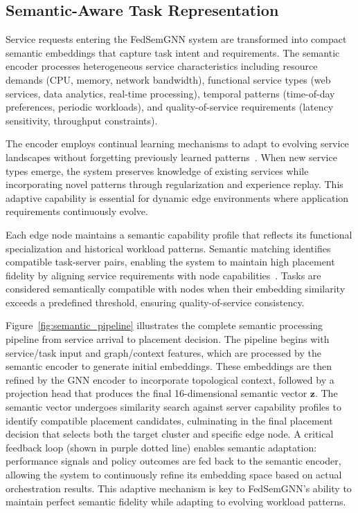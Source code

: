 \documentclass[conference]{IEEEtran}
\begin{document}
	\subsection{Semantic-Aware Task Representation}
	\label{subsec:semantic_representation}
	
	Service requests entering the FedSemGNN system are transformed into compact semantic embeddings that capture task intent and requirements. The semantic encoder processes heterogeneous service characteristics including resource demands (CPU, memory, network bandwidth), functional service types (web services, data analytics, real-time processing), temporal patterns (time-of-day preferences, periodic workloads), and quality-of-service requirements (latency sensitivity, throughput constraints).
	
	The encoder employs continual learning mechanisms to adapt to evolving service landscapes without forgetting previously learned patterns~\cite{yan2023v2v, prathiba2022}. When new service types emerge, the system preserves knowledge of existing services while incorporating novel patterns through regularization and experience replay. This adaptive capability is essential for dynamic edge environments where application requirements continuously evolve.
	
	Each edge node maintains a semantic capability profile that reflects its functional specialization and historical workload patterns. Semantic matching identifies compatible task-server pairs, enabling the system to maintain high placement fidelity by aligning service requirements with node capabilities~\cite{li2021network, jere2023distributed}. Tasks are considered semantically compatible with nodes when their embedding similarity exceeds a predefined threshold, ensuring quality-of-service consistency.
	
	Figure~\ref{fig:semantic_pipeline} illustrates the complete semantic processing pipeline from service arrival to placement decision. The pipeline begins with service/task input and graph/context features, which are processed by the semantic encoder to generate initial embeddings. These embeddings are then refined by the GNN encoder to incorporate topological context, followed by a projection head that produces the final 16-dimensional semantic vector $\mathbf{z}$. The semantic vector undergoes similarity search against server capability profiles to identify compatible placement candidates, culminating in the final placement decision that selects both the target cluster and specific edge node. A critical feedback loop (shown in purple dotted line) enables semantic adaptation: performance signals and policy outcomes are fed back to the semantic encoder, allowing the system to continuously refine its embedding space based on actual orchestration results. This adaptive mechanism is key to FedSemGNN's ability to maintain perfect semantic fidelity while adapting to evolving workload patterns.
	
\end{document}
